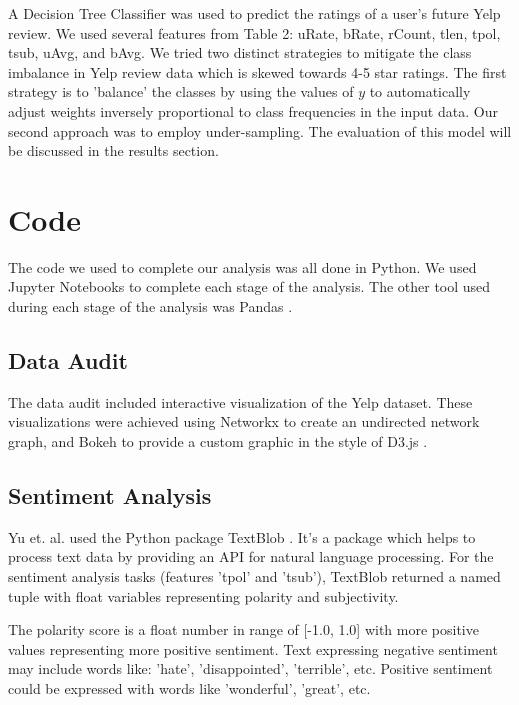 \documentclass[12pt]{article}
\begin{document}
A Decision Tree Classifier \cite{sklearnt25:online} was used to predict the ratings
of a user's future Yelp review. We used several features from Table 2: uRate, bRate, rCount,
tlen, tpol, tsub, uAvg, and bAvg. We tried two distinct strategies to mitigate the class imbalance
in Yelp review data which is skewed towards 4-5 star ratings. The first strategy is to
'balance' the classes by using the values of $y$ to automatically adjust weights inversely
proportional to class frequencies in the input data. Our second approach was to employ
under-sampling. The evaluation of this model will be discussed in the results section.

\section{Code}

The code we used to complete our analysis was all done in Python. We used Jupyter Notebooks
\cite{ProjectJ85:online} to complete each stage of the analysis. The other tool used during
each stage of the analysis was Pandas \cite{PythonDa47:online}.

\subsection{Data Audit}

The data audit included interactive visualization of the Yelp dataset. These visualizations
were achieved using Networkx \cite{NetworkX32:online} to create an undirected network graph,
and Bokeh \cite{Welcomet73:online}  to provide a custom graphic in the style of D3.js
\cite{D3jsData97:online}. 

\subsection{Sentiment Analysis}

Yu et. al. \cite{yu2015restaurants} used the Python package TextBlob \cite{TextBlob35:online}.
It's a package which helps to process text data by providing an API for natural language
processing. For the sentiment analysis tasks (features 'tpol' and 'tsub'), TextBlob returned
a named tuple with float variables representing polarity and subjectivity.

The polarity score is a float number in range of [-1.0, 1.0] with more positive values
representing more positive sentiment. Text expressing negative sentiment may include words
like: 'hate', 'disappointed', 'terrible', etc. Positive sentiment could be expressed with
words like 'wonderful', 'great', etc.
\end{document}
